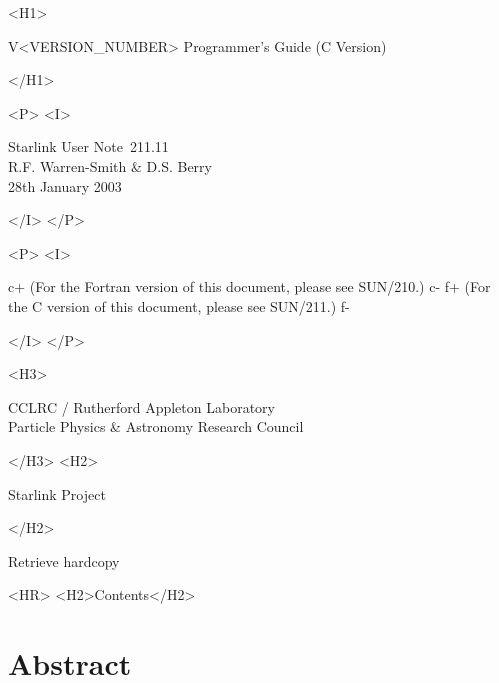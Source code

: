 \documentclass[twoside,11pt]{article}
\newcommand{\stardoccategory}  {Starlink User Note}
\newcommand{\stardocsource}    {sun\stardocnumber}
\newcommand{\stardocnumber}    {211.11}
\newcommand{\stardocnumber}    {210.11}
\newcommand{\stardocauthors}   {R.F. Warren-Smith \& D.S. Berry}
\newcommand{\stardocdate}      {28th January 2003}
\newcommand{\stardocversion}   {V<VERSION_NUMBER>}
\newcommand{\stardocmanualhtml}{Programmer's Guide (C Version)}
\newcommand{\stardocmanualhtml}{Programmer's Guide (Fortran Version)}
\newcommand{\htmladdnormallink}[2]{#1}
\newcommand{\htmladdimg}[1]{}
\newcommand{\htmlref}[2]{#1}
\newcommand{\htmladdtonavigation}[1]{}
\newcommand{\xref}[3]{#1}
\newcommand{\xlabel}[1]{}
\newcommand{\latexonlytoc}[0]{\tableofcontents}
\begin{document}
\begin{htmlonly}
   \begin{rawhtml} <H1> \end{rawhtml}
      \stardocversion
      \stardocmanualhtml
   \begin{rawhtml} </H1> \end{rawhtml}
   \begin{rawhtml} <P> <I> \end{rawhtml}
   \stardoccategory\ \stardocnumber \\
   \stardocauthors \\
   \stardocdate
   \begin{rawhtml} </I> </P> \end{rawhtml}
   \begin{rawhtml} <P> <I> \end{rawhtml}
c+
   (For the Fortran version of this document, please see
    \xref{SUN/210}{sun210}{}.)
c-
f+
   (For the C version of this document, please see \xref{SUN/211}{sun211}{}.)
f-
   \begin{rawhtml} </I> </P> \end{rawhtml}
   \begin{rawhtml} <H3> \end{rawhtml}
      \htmladdnormallink{CCLRC}{http://www.cclrc.ac.uk} /
      \htmladdnormallink{Rutherford Appleton Laboratory}
                        {http://www.cclrc.ac.uk/ral} \\
      \htmladdnormallink{Particle Physics \& Astronomy Research Council}
                        {http://www.pparc.ac.uk} \\
   \begin{rawhtml} </H3> <H2> \end{rawhtml}
      \htmladdnormallink{Starlink Project}{http://www.starlink.rl.ac.uk/}
   \begin{rawhtml} </H2> \end{rawhtml}
   \htmladdnormallink{\htmladdimg{source.gif} Retrieve hardcopy}
      {http://www.starlink.rl.ac.uk/cgi-bin/hcserver?\stardocsource}\\

  \label{stardoccontents}
  \begin{rawhtml} 
    <HR>
    <H2>Contents</H2>
  \end{rawhtml}
  \renewcommand{\latexonlytoc}[0]{}
  \htmladdtonavigation{\htmlref{\htmladdimg{contents_motif.gif}}
        {stardoccontents}}

  \section{\xlabel{abstract}Abstract}
\end{htmlonly}
\end{document}
